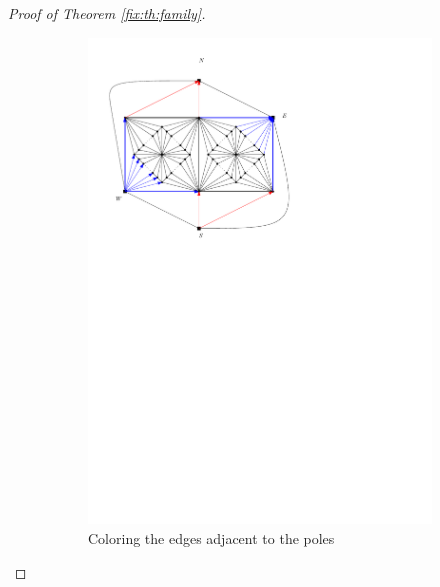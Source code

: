 \begin{proof}[Proof of Theorem \ref{fix:th:family}]
  \begin{figure}[h]
    \centering

    \begin{subfigure}[t]{0.3\textwidth}
      \includegraphics[width=\textwidth]{fixExtension/img/manymany1}
      \caption{Coloring the edges adjacent to the poles}
      \label{fig:fix:manymany1}
    \end{subfigure}
    \quad
    \begin{subfigure}[t]{0.3\textwidth}

\end{subfigure}
\end{figure}
\end{proof}
